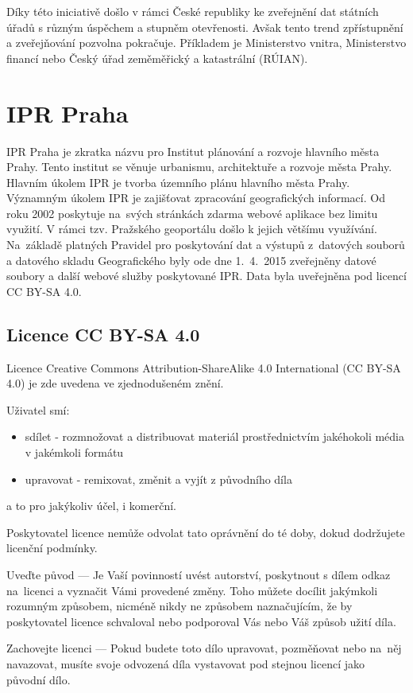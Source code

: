 Díky této iniciativě došlo v rámci České republiky ke zveřejnění
dat státních úřadů s různým úspěchem a stupněm otevřenosti.
Avšak tento trend zpřístupnění a zveřejňování pozvolna pokračuje.
Příkladem je Ministerstvo vnitra, Ministerstvo financí nebo Český úřad zeměměřický a katastrální (RÚIAN).


\section{IPR Praha}
\label{IPR Praha}
IPR Praha je zkratka názvu pro Institut plánování a rozvoje
hlavního města Prahy. Tento institut se věnuje urbanismu, architektuře
a rozvoje města Prahy. Hlavním úkolem IPR je tvorba územního plánu
hlavního města Prahy. Významným úkolem IPR je zajišťovat zpracování geografických
informací. Od roku 2002 poskytuje
na~svých stránkách zdarma webové aplikace bez limitu využití.
V rámci tzv. Pražského geoportálu došlo k jejich většímu využívání.
Na~základě platných Pravidel pro poskytování dat a výstupů z~datových
souborů a datového skladu Geografického byly ode dne 1.~4.~2015
zveřejněny datové soubory a další webové služby poskytované IPR. Data byla
uveřejněna pod licencí CC BY-SA 4.0. \cite{IPR}

\subsection{Licence CC BY-SA 4.0}
\label{licence CC BY-SA 4.0}
Licence Creative Commons Attribution-ShareAlike 4.0 International (CC BY-SA 4.0)
je zde uvedena ve zjednodušeném znění.

Uživatel smí:

\begin{itemize}
    \item   sdílet - rozmnožovat a distribuovat materiál prostřednictvím jakéhokoli média v jakémkoli formátu
    \item   upravovat - remixovat, změnit a vyjít z původního díla
\end{itemize}
a to pro jakýkoliv účel, i komerční.

Poskytovatel licence nemůže odvolat tato oprávnění do té doby, dokud dodržujete licenční podmínky.

Uveďte původ — Je Vaší povinností uvést autorství, poskytnout s dílem odkaz
na~licenci a vyznačit Vámi provedené změny. Toho můžete docílit jakýmkoli
rozumným způsobem, nicméně nikdy ne způsobem naznačujícím, že by poskytovatel
licence schvaloval nebo podporoval Vás nebo Váš způsob užití díla.

Zachovejte licenci — Pokud budete toto dílo upravovat, pozměňovat nebo
na~něj navazovat, musíte svoje odvozená díla vystavovat pod stejnou
licencí jako původní dílo.\cite{CCBYSA4}
